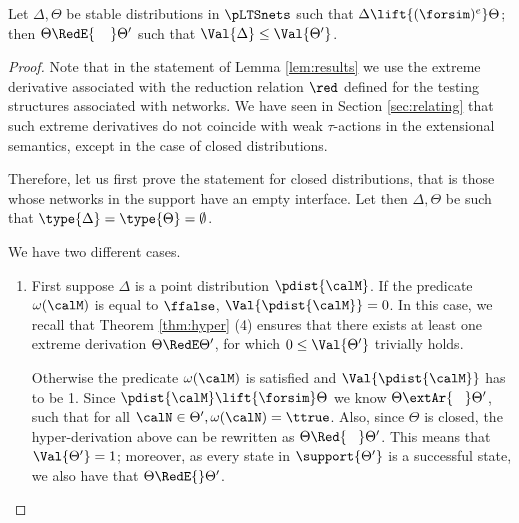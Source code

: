 \documentclass{LMCS}
\begin{document}
\begin{lem}
 \label{lem:results}
  Let $\Delta, \Theta$ be stable distributions in  $\pLTSnets$ such that $\Delta \lift{(\forsim)^e} \Theta$; 
  then $\Theta \RedE{\;\;\;\;} \Theta'$ such that $\Val{\Delta} \leq \Val{\Theta'}$. 
\end{lem}
\begin{proof}
	Note that in the statement of Lemma \ref{lem:results} 
	we use the extreme derivative associated with the reduction relation 
  $\red$ defined for the testing structures associated with networks. 
  We have seen in Section \ref{sec:relating} that such extreme derivatives 
  do not coincide with weak $\tau$-actions in the extensional semantics, 
  except in the case of closed distributions.

	Therefore, let us first prove the statement for closed distributions, 
	that is those whose networks in the support have an empty interface. 
	Let then $\Delta, \Theta$ be such that $\type{\Delta} = \type{\Theta} = \emptyset$.
	
  We have two different cases.
  \begin{enumerate}[label=(\roman*)]
  \item First suppose $\Delta$ is a point distribution $\pdist{\calM}$. If the predicate $\omega(\calM)$ 
    is equal to $\ffalse$, $\Val{\pdist{\calM}} = 0$. 
    In this case, we recall that Theorem \ref{thm:hyper} (4) ensures that 
    there exists at least one extreme derivation $\Theta \RedE \Theta'$, for which 
    $0 \leq \Val{\Theta'}$ trivially holds. 
    
    Otherwise the predicate $\omega(\calM)$ is satisfied and $\Val{\pdist{\calM}}$ has to be 1. Since 
    $\pdist{\calM} \lift{\forsim}
    \Theta$ we know $\Theta \extAr{\;\;\;} \Theta'$, such that for all $\calN \in \Theta', 
    \omega(\calN) = \ttrue$. Also, since $\Theta$ is closed, the hyper-derivation 
    above can be rewritten as $\Theta \Red{\;\;\;} \Theta'$. This means that $\Val{\Theta'} = 1$; 
    moreover, as every state in $\support{\Theta'}$ is a successful state, we also have that 
    $\Theta \RedE{} \Theta'$.


\end{enumerate}
\end{proof}
\end{document}
